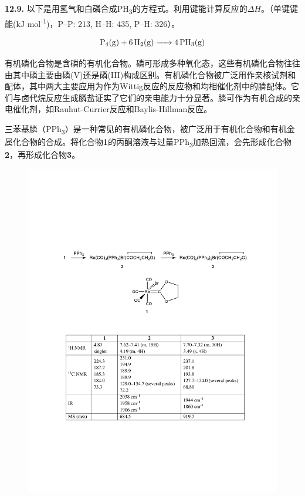 \noindent\textbf{12.9.}
以下是用氢气和白磷合成PH\textsubscript{3}的方程式。利用键能计算反应的$\Delta H$。（单键键能(kJ mol\textsuperscript{-1})，P--P: 213, H--H: 435, P--H: 326）。

$$\ce{P4(g)}+\ce{6H2(g) -> 4 PH3(g)}$$

有机磷化合物是含磷的有机化合物。磷可形成多种氧化态，这些有机磷化合物往往由其中磷主要由磷(V)还是磷(III)构成区别。有机磷化合物被广泛用作亲核试剂和配体，其中两大主要应用为作为Wittig反应的反应物和均相催化剂中的膦配体。它们与卤代烷反应生成膦盐证实了它们的亲电能力十分显著。膦可作为有机合成的亲电催化剂，如Rauhut-Currier反应和Baylis-Hillman反应。

三苯基膦（PPh\textsubscript{3}）是一种常见的有机磷化合物，被广泛用于有机化合物和有机金属化合物的合成。将化合物\textbf{1}的丙酮溶液与过量PPh\textsubscript{3}加热回流，会先形成化合物\textbf{2}，再形成化合物\textbf{3}。

\begin{figure}[h]
	\centering
	\includegraphics[width=15cm]{./pic/t12-4.pdf}
\end{figure}

